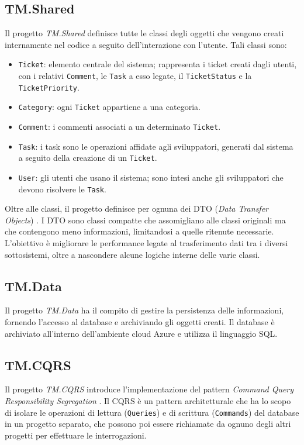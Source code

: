 \subsection{TM.Shared}
Il progetto \textit{TM.Shared} definisce tutte le classi degli oggetti che vengono creati internamente nel codice a seguito dell'interazione
con l'utente. Tali classi sono:
\begin{itemize}
    \item \texttt{Ticket}: elemento centrale del sistema; rappresenta i ticket creati dagli utenti, con i relativi \texttt{Comment},
        le \texttt{Task} a esso legate, il \texttt{TicketStatus} e la \texttt{TicketPriority}.
    \item \texttt{Category}: ogni \texttt{Ticket} appartiene a una categoria.
    \item \texttt{Comment}: i commenti associati a un determinato \texttt{Ticket}.
    \item \texttt{Task}: i task sono le operazioni affidate agli sviluppatori, generati dal sistema a seguito della creazione
        di un \texttt{Ticket}.
    \item \texttt{User}: gli utenti che usano il sistema; sono intesi anche gli sviluppatori che devono risolvere le \texttt{Task}.
\end{itemize}
Oltre alle classi, il progetto definisce per ognuna dei DTO (\textit{Data Transfer Objects}) \cite{microsoft_webapi_ef_part5}.
I DTO sono classi compatte che assomigliano alle classi originali ma che contengono meno informazioni, limitandosi a quelle ritenute necessarie.
L'obiettivo è migliorare le performance legate al trasferimento dati tra i diversi sottosistemi, oltre a nascondere alcune logiche interne delle varie classi.

\subsection{TM.Data}
Il progetto \textit{TM.Data} ha il compito di gestire la persistenza delle informazioni, fornendo l'accesso al database
e archiviando gli oggetti creati. Il database è archiviato all'interno dell'ambiente cloud Azure e utilizza il linguaggio SQL.

\subsection{TM.CQRS}
Il progetto \textit{TM.CQRS} introduce l'implementazione del pattern \textit{Command Query Responsibility Segregation} \cite{azure_cqrs_msdocs}.
Il CQRS è un pattern architetturale che ha lo scopo di isolare le operazioni di lettura (\texttt{Queries}) e di scrittura (\texttt{Commands})
del database in un progetto separato, che possono poi essere richiamate da ognuno degli altri progetti per effettuare le interrogazioni.

